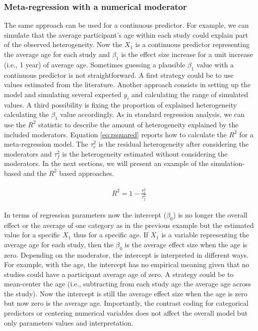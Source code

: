 \documentclass[
  man,floatsintext]{apa6}
\begin{document}
\normalsize

\hypertarget{meta-regression-with-a-numerical-moderator}{%
\subsubsection{Meta-regression with a numerical moderator}\label{meta-regression-with-a-numerical-moderator}}

The same approach can be used for a continuous predictor. For example, we can simulate that the average participant's age within each study could explain part of the observed heterogeneity. Now the \(X_1\) is a continuous predictor representing the average age for each study and \(\beta_1\) is the effect size increase for a unit increase (i.e., 1 year) of average age. Sometimes guessing a plausible \(\beta_1\) value with a continuous predictor is not straightforward. A first strategy could be to use values estimated from the literature. Another approach consists in setting up the model and simulating several expected \color{red} \(y_i\) \color{black} and calculating the range of simulated values. A third possibility is fixing the proportion of explained heterogeneity calculating the \(\beta_1\) value accordingly. As in standard regression analysis, we can use the \(R^2\) statistic to describe the amount of heterogeneity explained by the included moderators. Equation \eqref{eq:rsquared} reports how to calculate the \(R^2\) for a meta-regression model. The \(\tau^2_{r}\) is the residual heterogeneity after considering the moderators and \(\tau^2_{f}\) is the heterogeneity estimated without considering the moderators. In the next sections, we will present an example of the simulation-based and the \(R^2\) based approaches.

\begin{align}
\begin{aligned}
R^2 = 1 - \frac{\tau^2_{r}}{\tau^2_{f}}
\label{eq:rsquared}
\end{aligned}
\end{align}

In terms of regression parameters now the intercept (\(\beta_0\)) is no longer the overall effect or the average of one category as in the previous example but the estimated value for a specific \(X_1\) thus for a specific age. If \(X_1\) is a variable representing the average age for each study, then the \(\beta_0\) is the average effect size when the age is zero. Depending on the moderator, the intercept is interpreted in different ways. For example, with the age, the intercept has no empirical meaning given that no studies could have a participant average age of zero. A strategy could be to mean-center the age (i.e., subtracting from each study age the average age across the study). Now the intercept is still the average effect size when the age is zero but now zero is the average age. Importantly, the contrast coding for categorical predictors or centering numerical variables does not affect the overall model but only parameters values and interpretation.
\end{document}
